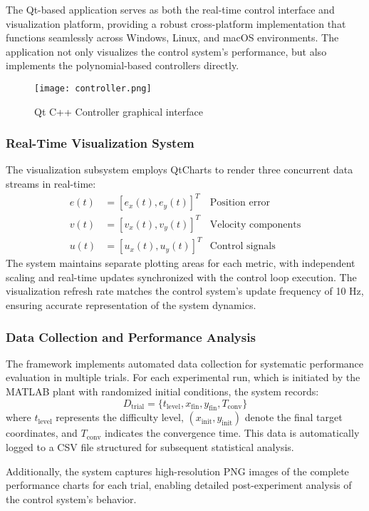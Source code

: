 \documentclass[12pt]{article}
\begin{document}
The Qt-based application serves as both the real-time control interface and visualization platform, providing a robust cross-platform implementation that functions seamlessly across Windows, Linux, and macOS environments. The application not only visualizes the control system's performance, but also implements the polynomial-based controllers directly.
\begin{figure}
    \centering
    \texttt{[image: controller.png]}
    \caption{Qt C++ Controller graphical interface}
    \label{fig:controller}
\end{figure}
\subsubsection{Real-Time Visualization System}
The visualization subsystem employs QtCharts to render three concurrent data streams in real-time:
\begin{align}
e(t) &= [e_x(t), e_y(t)]^T & \text{Position error} \\
v(t) &= [v_x(t), v_y(t)]^T & \text{Velocity components} \\
u(t) &= [u_x(t), u_y(t)]^T & \text{Control signals}
\end{align}
The system maintains separate plotting areas for each metric, with independent scaling and real-time updates synchronized with the control loop execution. The visualization refresh rate matches the control system's update frequency of 10 Hz, ensuring accurate representation of the system dynamics.

\subsubsection{Data Collection and Performance Analysis}
The framework implements automated data collection for systematic performance evaluation in multiple trials. For each experimental run, which is initiated by the MATLAB plant with randomized initial conditions, the system records:
\begin{equation}
D_{\text{trial}} = \{t_{\text{level}}, x_{\text{fin}}, y_{\text{fin}}, T_{\text{conv}}\}
\end{equation}
where $t_{\text{level}}$ represents the difficulty level, $(x_{\text{init}}, y_{\text{init}})$ denote the final target coordinates, and $T_{\text{conv}}$ indicates the convergence time. This data is automatically logged to a CSV file structured for subsequent statistical analysis.

Additionally, the system captures high-resolution PNG images of the complete performance charts for each trial, enabling detailed post-experiment analysis of the control system's behavior.
\end{document}
